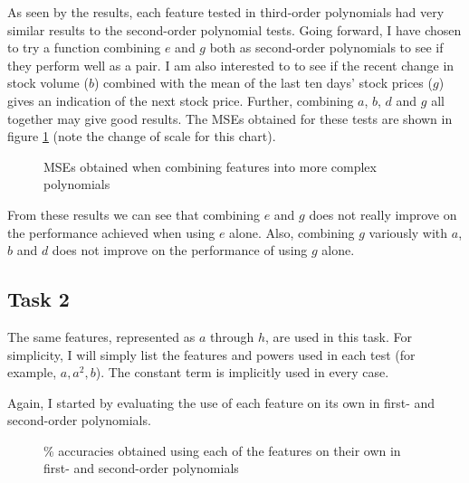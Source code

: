 \documentclass[a4paper,11pt]{article}
\newcommand*{\fod}[4]{f(\theta) = \theta_0 + \theta_1 {#1} + \theta_2 {#2} + \theta_3 {#3} + \theta_4 {#4}}
\newcommand*{\fd}[4]{$\fod{#1}{#2}{#3}{#4}$}
\newcommand*{\foe}[5]{f(\theta) = \theta_0 + \theta_1 {#1} + \theta_2 {#2} + \theta_3 {#3} + \theta_4 {#4} + \theta_5 {#5}}
\newcommand*{\fe}[5]{$\foe{#1}{#2}{#3}{#4}{#5}$}
\begin{document}
As seen by the results, each feature tested in third-order polynomials had very similar results to the second-order polynomial tests.  Going forward, I have chosen to try a function combining $e$ and $g$ both as second-order polynomials to see if they perform well as a pair.  I am also interested to to see if the recent change in stock volume ($b$) combined with the mean of the last ten days' stock prices ($g$) gives an indication of the next stock price.  Further, combining $a$, $b$, $d$ and $g$ all together may give good results.  The MSEs obtained for these tests are shown in figure \ref{task1complex} (note the change of scale for this chart).

\begin{figure}
\centering
\begin{bchart}[step=1,max=2]
	\bcbar[label={\fd{e}{e^2}{g}{g^2}}]{0.392}
		\smallskip
	\bcbar[label={\fd{b}{b^2}{g}{g^2}}]{1.56}
		\smallskip
	\bcbar[label={\fe{a}{b}{d}{g}{g^2}}]{1.46}
\end{bchart}
\caption{MSEs obtained when combining features into more complex polynomials}
\label{task1complex}
\end{figure}

From these results we can see that combining $e$ and $g$ does not really improve on the performance achieved when using $e$ alone.  Also, combining $g$ variously with $a$, $b$ and $d$ does not improve on the performance of using $g$ alone.

\subsection{Task 2}

The same features, represented as $a$ through $h$, are used in this task.  For simplicity, I will simply list the features and powers used in each test (for example, $a,a^2,b$).  The constant term is implicitly used in every case.

Again, I started by evaluating the use of each feature on its own in first- and second-order polynomials.

\begin{figure}
\centering
\begin{bchart}[step=20,max=100]
		\smallskip
		\smallskip
		\smallskip
		\smallskip
		\smallskip
		\smallskip
		\smallskip
		\smallskip
		\smallskip
		\smallskip
		\smallskip
		\smallskip
		\smallskip
		\smallskip
		\smallskip
\end{bchart}
\caption{\% accuracies obtained using each of the features on their own in first- and second-order polynomials}
\label{task2onetwoorder}
\end{figure}
\end{document}
